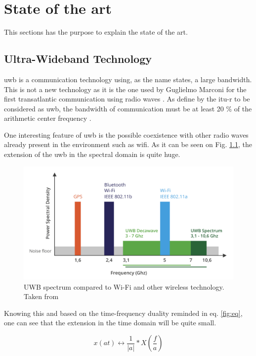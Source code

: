 % 			 
%
%

\chapter{State of the art}
\label{stateoftheart}

This sections has the purpose to explain the state of the art.

\section{Ultra-Wideband Technology}
\label{uwb}
\gls{uwb} is a communication technology using, as the name states, a large bandwidth. This is not a new technology as it is the one used by  Guglielmo Marconi for the first transatlantic communication using radio waves \cite{nekoogar2005uwb}. As define by the \gls{itu-r} to be considered as \gls{uwb}, the bandwidth of communication must be at least 20 \% of the arithmetic center frequency \cite{itur2006characteristics}.

One interesting feature of \gls{uwb} is the possible coexistence with other radio waves already present in the environment such as \gls{wifi}. As it can be seen on Fig. \ref{fig:UWB_Techonology}, the extension of the \gls{uwb} in the spectral domain is quite huge. 

\begin{figure}[H]
\includegraphics[width=.6\linewidth]{Images/uwb_bandwidth.png}
\centering
\caption{UWB spectrum compared to Wi-Fi and other wireless technology. Taken from \cite{itur2006characteristics}}
\label{fig:UWB_Techonology}
\end{figure} 

Knowing this and based on the time-frequency duality reminded in eq. \ref{fig:eq}, one can see that the extension in the time domain will be quite small.

\begin{equation}
	x(at) \longleftrightarrow \frac{1}{|a|}*X(\frac{f}{a})
\label{fig:eq}
\end{equation}

